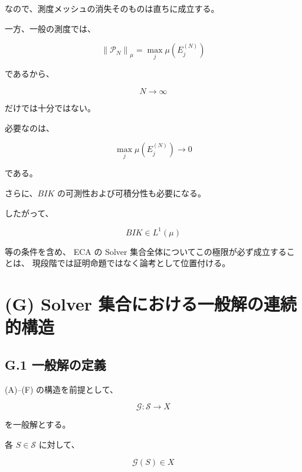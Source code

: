 \documentclass[a4paper,11pt]{article}
\newcommand{\Solver}{\mathcal{S}}
\newcommand{\Eval}{\mathcal{G}}
\begin{document}
なので、測度メッシュの消失そのものは直ちに成立する。

一方、一般の測度では、

\begin{equation}
    \left\|\mathcal{P}_N\right\|_\mu
    =
    \max_j\mu(E_j^{(N)})
\end{equation}

であるから、

\begin{equation}
    N\to\infty
\end{equation}

だけでは十分ではない。

必要なのは、

\begin{equation}
    \max_j\mu(E_j^{(N)})
    \longrightarrow0
\end{equation}

である。

さらに、$BIK$ の可測性および可積分性も必要になる。

したがって、

\begin{equation}
    BIK\in L^1(\mu)
\end{equation}

等の条件を含め、
ECA の Solver 集合全体についてこの極限が必ず成立することは、
現段階では証明命題ではなく論考として位置付ける。


\section{(G) Solver 集合における一般解の連続的構造}

\subsection{G.1 一般解の定義}

(A)--(F) の構造を前提として、

\begin{equation}
    \boxed{
        \Eval:\Solver\to X
    }
\end{equation}

を一般解とする。

各 $S\in\Solver$ に対して、

\begin{equation}
    \Eval(S)\in X
\end{equation}
\end{document}
